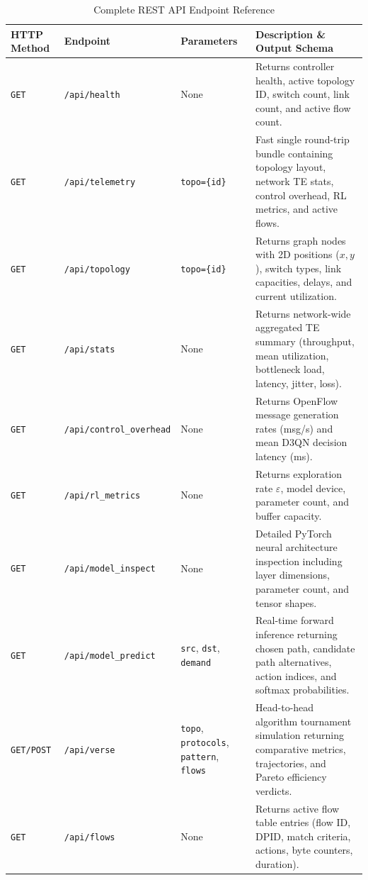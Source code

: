 \documentclass[12pt,a4paper,oneside]{report}
\begin{document}
\begin{table}[htbp]
\centering
\caption{Complete REST API Endpoint Reference}
\label{tab:rest_api_reference}
\small
\begin{tabularx}{\textwidth}{l l p{4.2cm} X}
\toprule
\textbf{HTTP Method} & \textbf{Endpoint} & \textbf{Parameters} & \textbf{Description \& Output Schema} \\
\midrule
\texttt{GET} & \texttt{/api/health} & None & Returns controller health, active topology ID, switch count, link count, and active flow count. \\
\addlinespace
\texttt{GET} & \texttt{/api/telemetry} & \texttt{topo=\{id\}} & Fast single round-trip bundle containing topology layout, network TE stats, control overhead, RL metrics, and active flows. \\
\addlinespace
\texttt{GET} & \texttt{/api/topology} & \texttt{topo=\{id\}} & Returns graph nodes with 2D positions ($x, y$), switch types, link capacities, delays, and current utilization. \\
\addlinespace
\texttt{GET} & \texttt{/api/stats} & None & Returns network-wide aggregated TE summary (throughput, mean utilization, bottleneck load, latency, jitter, loss). \\
\addlinespace
\texttt{GET} & \texttt{/api/control\_overhead} & None & Returns OpenFlow message generation rates (msg/s) and mean D3QN decision latency (ms). \\
\addlinespace
\texttt{GET} & \texttt{/api/rl\_metrics} & None & Returns exploration rate $\varepsilon$, model device, parameter count, and buffer capacity. \\
\addlinespace
\texttt{GET} & \texttt{/api/model\_inspect} & None & Detailed PyTorch neural architecture inspection including layer dimensions, parameter count, and tensor shapes. \\
\addlinespace
\texttt{GET} & \texttt{/api/model\_predict} & \texttt{src}, \texttt{dst}, \texttt{demand} & Real-time forward inference returning chosen path, candidate path alternatives, action indices, and softmax probabilities. \\
\addlinespace
\texttt{GET/POST} & \texttt{/api/verse} & \texttt{topo}, \texttt{protocols}, \texttt{pattern}, \texttt{flows} & Head-to-head algorithm tournament simulation returning comparative metrics, trajectories, and Pareto efficiency verdicts. \\
\addlinespace
\texttt{GET} & \texttt{/api/flows} & None & Returns active flow table entries (flow ID, DPID, match criteria, actions, byte counters, duration). \\

\end{tabularx}
\end{table}
\end{document}

